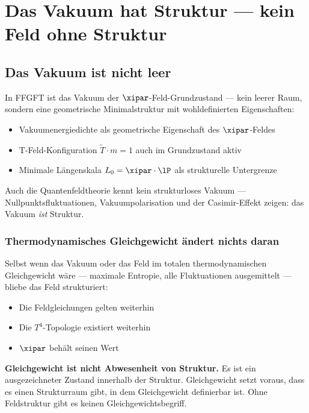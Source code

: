 \section{Das Vakuum hat Struktur --- kein Feld ohne Struktur}

\subsection{Das Vakuum ist nicht leer}

In FFGFT ist das Vakuum der $\xipar$-Feld-Grundzustand --- kein leerer Raum, sondern eine geometrische Minimalstruktur mit wohldefinierten Eigenschaften:
\begin{itemize}
  \item Vakuumenergiedichte als geometrische Eigenschaft des $\xipar$-Feldes
  \item T-Feld-Konfiguration $\tilde{T} \cdot m = 1$ auch im Grundzustand aktiv
  \item Minimale Längenskala $L_0 = \xipar \cdot \lP$ als strukturelle Untergrenze
\end{itemize}

Auch die Quantenfeldtheorie kennt kein strukturloses Vakuum --- Nullpunktsfluktuationen, Vakuumpolarisation und der Casimir-Effekt zeigen: das Vakuum \emph{ist} Struktur.

\subsubsection{Thermodynamisches Gleichgewicht ändert nichts daran}

Selbst wenn das Vakuum oder das Feld im totalen thermodynamischen Gleichgewicht wäre --- maximale Entropie, alle Fluktuationen ausgemittelt --- bliebe das Feld strukturiert:
\begin{itemize}
  \item Die Feldgleichungen gelten weiterhin
  \item Die $T^4$-Topologie existiert weiterhin
  \item $\xipar$ behält seinen Wert
\end{itemize}

\begin{wichtig}
\textbf{Gleichgewicht ist nicht Abwesenheit von Struktur.} Es ist ein ausgezeichneter Zustand innerhalb der Struktur. Gleichgewicht setzt voraus, dass es einen Strukturraum gibt, in dem Gleichgewicht definierbar ist. Ohne Feldstruktur gibt es keinen Gleichgewichtsbegriff.
\end{wichtig}


